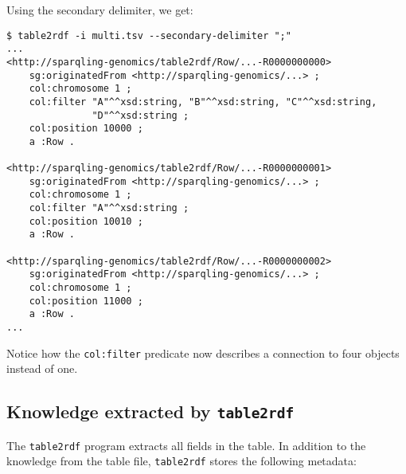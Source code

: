   Using the secondary delimiter, we get:

\begin{siderules}
\begin{verbatim}
$ table2rdf -i multi.tsv --secondary-delimiter ";"
...
<http://sparqling-genomics/table2rdf/Row/...-R0000000000>
    sg:originatedFrom <http://sparqling-genomics/...> ;
    col:chromosome 1 ;
    col:filter "A"^^xsd:string, "B"^^xsd:string, "C"^^xsd:string,
               "D"^^xsd:string ;
    col:position 10000 ;
    a :Row .

<http://sparqling-genomics/table2rdf/Row/...-R0000000001>
    sg:originatedFrom <http://sparqling-genomics/...> ;
    col:chromosome 1 ;
    col:filter "A"^^xsd:string ;
    col:position 10010 ;
    a :Row .

<http://sparqling-genomics/table2rdf/Row/...-R0000000002>
    sg:originatedFrom <http://sparqling-genomics/...> ;
    col:chromosome 1 ;
    col:position 11000 ;
    a :Row .
...
\end{verbatim}
\end{siderules}

  Notice how the \texttt{col:filter} predicate now describes a
  connection to four objects instead of one.

\subsection{Knowledge extracted by \texttt{table2rdf}}

  The \texttt{table2rdf} program extracts all fields in the table.  In addition
  to the knowledge from the table file, \texttt{table2rdf} stores the following
  metadata:

